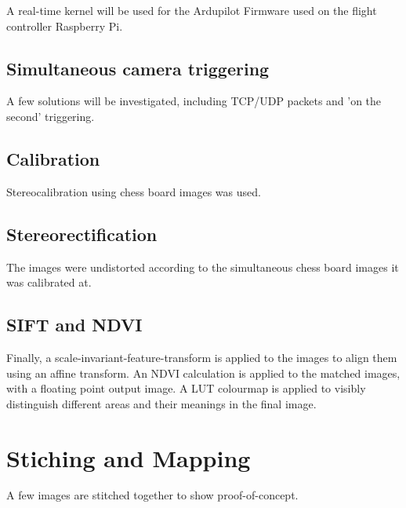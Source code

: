 A real-time kernel will be used for the Ardupilot Firmware used on the flight controller Raspberry Pi.

\subsection{Simultaneous camera triggering}

A few solutions will be investigated, including TCP/UDP packets and 'on the second' triggering.

\subsection{Calibration}

Stereocalibration using chess board images was used.

\subsection{Stereorectification}

The images were undistorted according to the simultaneous chess board images it was calibrated at.

\subsection{SIFT and NDVI}

Finally, a scale-invariant-feature-transform is applied to the images to align them using an affine transform. An NDVI calculation is applied to the matched images, with a floating point output image. A LUT colourmap is applied to visibly distinguish different areas and their meanings in the final image.

\section{Stiching and Mapping}

A few images are stitched together to show proof-of-concept.